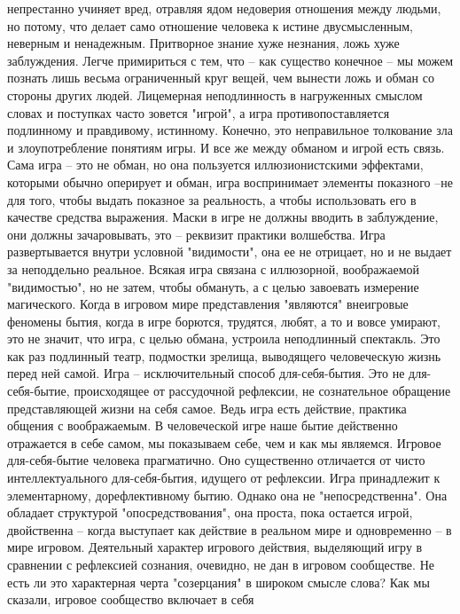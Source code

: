 \documentclass[12pt]{article}
\begin{document}
непрестанно учиняет вред, отравляя ядом недоверия отношения между людьми, но потому, что делает само
отношение человека к истине двусмысленным, неверным и ненадежным. Притворное знание хуже незнания,
ложь хуже заблуждения. Легче примириться с тем, что -- как существо конечное -- мы можем познать лишь
весьма  ограниченный  круг  вещей,  чем  вынести  ложь  и  обман  со  стороны  других  людей.  Лицемерная
неподлинность в нагруженных смыслом словах и поступках часто зовется "игрой", а игра противопоставляется
подлинному и правдивому, истинному. Конечно, это неправильное толкование зла и злоупотребление понятиям
игры.  И  все  же  между  обманом  и  игрой  есть  связь.  Сама  игра  --  это  не  обман,  но  она  пользуется
иллюзионистскими эффектами, которыми обычно оперирует и обман, игра воспринимает элементы показного --не для того, чтобы выдать показное за реальность, а чтобы использовать его в качестве средства выражения.
Маски  в  игре  не  должны  вводить  в  заблуждение,  они  должны  зачаровывать,  это  --  реквизит  практики 
волшебства.  Игра  развертывается  внутри  условной  "видимости",  она  ее  не  отрицает,  но  и  не  выдает  за
неподдельно реальное. Всякая игра связана с иллюзорной, воображаемой "видимостью", но не затем, чтобы
обмануть,  а  с  целью  завоевать  измерение  магического.  Когда  в  игровом  мире  представления  "являются"
внеигровые феномены бытия, когда в игре борются, трудятся, любят, а то и вовсе умирают, это не значит, что
игра, с целью обмана, устроила неподлинный спектакль. Это как раз подлинный театр, подмостки зрелища,
выводящего человеческую жизнь перед ней самой. Игра -- исключительный способ для-себя-бытия. Это не для-себя-бытие, происходящее от рассудочной рефлексии, не сознательное обращение представляющей жизни на
себя самое. Ведь игра есть действие, практика общения с воображаемым. В человеческой игре наше бытие
действенно отражается в себе самом, мы показываем себе, чем и как мы являемся. Игровое для-себя-бытие
человека прагматично. Оно существенно отличается от чисто интеллектуального для-себя-бытия, идущего от
рефлексии. Игра принадлежит к элементарному, дорефлективному бытию. Однако она не "непосредственна".
Она обладает структурой "опосредствования", она проста, пока остается игрой, двойственна -- когда выступает
как действие в реальном мире и одновременно -- в мире игровом. Деятельный характер игрового действия,
выделяющий игру в сравнении с рефлексией сознания, очевидно, не дан в игровом сообществе. Не есть ли это
характерная черта "созерцания" в широком смысле слова? Как мы сказали, игровое сообщество включает в себя
\end{document}
